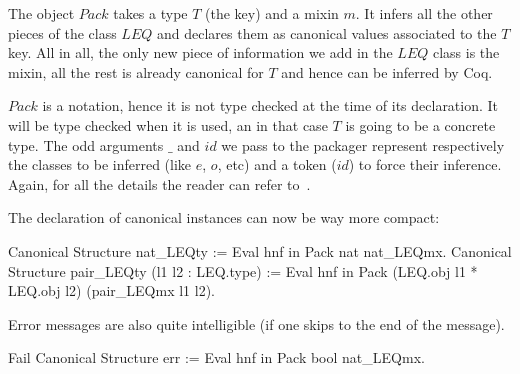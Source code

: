 The object $Pack$ takes a type $T$ (the key) and a mixin $m$.  It infers all
the other pieces of the class $LEQ$ and declares them as canonical values
associated to the $T$ key.  All in all, the only new piece of information
we add in the $LEQ$ class is the mixin, all the rest is already canonical
for $T$ and hence can be inferred by Coq.

$Pack$ is a notation, hence it is not type checked at the time of its
declaration.  It will be type checked when it is used, an in that case
$T$ is going to be a concrete type.  The odd arguments $\_$ and $id$ we
pass to the 
packager represent respectively the classes to be inferred (like $e$, $o$, etc) and a token ($id$) to force their inference.  Again, for all the details the
reader can refer to~\cite{CSwcu}. 

The declaration of canonical instances can now be way more compact:

\begin{coq_example}
Canonical Structure nat_LEQty := Eval hnf in Pack nat nat_LEQmx.
Canonical Structure pair_LEQty (l1 l2 : LEQ.type) :=
  Eval hnf in Pack (LEQ.obj l1 * LEQ.obj l2) (pair_LEQmx l1 l2).
\end{coq_example}

Error messages are also quite intelligible (if one skips to the end of
the message).

\begin{coq_example}
Fail Canonical Structure err := Eval hnf in Pack bool nat_LEQmx.
\end{coq_example}

